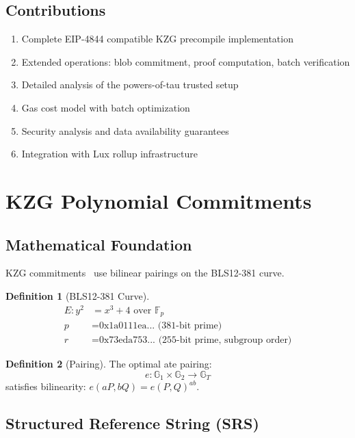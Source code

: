 \documentclass[11pt,a4paper]{article}
\theoremstyle{definition}
\newtheorem{definition}{Definition}
\begin{document}
\subsection{Contributions}

\begin{enumerate}
    \item Complete EIP-4844 compatible KZG precompile implementation
    \item Extended operations: blob commitment, proof computation, batch verification
    \item Detailed analysis of the powers-of-tau trusted setup
    \item Gas cost model with batch optimization
    \item Security analysis and data availability guarantees
    \item Integration with Lux rollup infrastructure
\end{enumerate}

\section{KZG Polynomial Commitments}

\subsection{Mathematical Foundation}

KZG commitments~\cite{kzg} use bilinear pairings on the BLS12-381 curve.

\begin{definition}[BLS12-381 Curve]
    \begin{align}
        E: y^2 &= x^3 + 4 \text{ over } \mathbb{F}_p \\
        p &= \text{0x1a0111ea...} \text{ (381-bit prime)} \\
        r &= \text{0x73eda753...} \text{ (255-bit prime, subgroup order)}
    \end{align}
\end{definition}

\begin{definition}[Pairing]
    The optimal ate pairing:
    \[
    e: \mathbb{G}_1 \times \mathbb{G}_2 \rightarrow \mathbb{G}_T
    \]
    satisfies bilinearity: $e(aP, bQ) = e(P, Q)^{ab}$.
\end{definition}

\subsection{Structured Reference String (SRS)}
\end{document}

